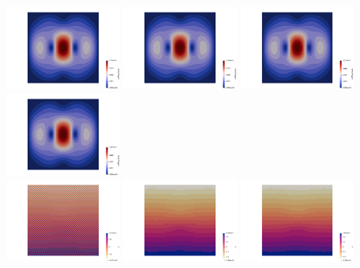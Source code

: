 \begin{center}
\includegraphics[width=3.8cm]{python_codes/fieldstone_78/results/block/full/vel0}
\includegraphics[width=3.8cm]{python_codes/fieldstone_78/results/block/full/vel1}
\includegraphics[width=3.8cm]{python_codes/fieldstone_78/results/block/full/vel2}
\includegraphics[width=3.8cm]{python_codes/fieldstone_78/results/block/full/vel3}\\
\includegraphics[width=3.8cm]{python_codes/fieldstone_78/results/block/full/p0}
\includegraphics[width=3.8cm]{python_codes/fieldstone_78/results/block/full/p1}
\includegraphics[width=3.8cm]{python_codes/fieldstone_78/results/block/full/p2}

\end{center}

